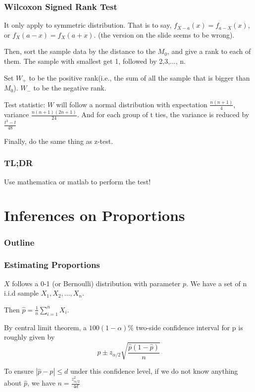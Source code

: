 \documentclass{beamer}
\begin{document}
\begin{frame}
    \frametitle{Wilcoxon Signed Rank Test}

    It only apply to symmetric distribution. That is to say, $f_{X-a}(x)=f_{a-X}(x)$, or $f_{X}(a-x)=f_{X}(a+x)$. (the version on the slide seems to be wrong).\par
    \vspace*{0.3cm}
    Then, sort the sample data by the distance to the $M_0$, and give a rank to each of them. The sample with smallest get 1, followed by 2,3,..., n.\par
    Set $W_{+}$ to be the positive rank(i.e., the sum of all the sample that is bigger than $M_0$). $W_{-}$ to be the negative rank.\par

    Test statistic: $W$ will follow a normal distribution with expectation $\frac{n(n+1)}{4}$, variance $\frac{n(n+1)(2n+1)}{24}$. And for each group of t ties, the variance is reduced by $\frac{t^3-t}{48}$\par
    Finally, do the same thing as z-test.

\end{frame}

\begin{frame}
    \frametitle{TL;DR}

    Use mathematica or matlab to perform the test!\par
    

\end{frame}

\section{Inferences on Proportions}
\begin{frame}
    \frametitle{Outline}
    \tableofcontents[currentsection]
\end{frame}

\begin{frame}
    \frametitle{Estimating Proportions}
    $X$ follows a 0-1 (or Bernoulli) distribution with parameter $p$. We have a set of n i.i.d sample $X_1, X_2, \dots , X_n$.\par
    Then $\hat{p}=\frac{1}{n}\sum\limits_{i=1}^{n}X_i$. \par
    By central limit theorem, a $100(1-\alpha)\%$ two-side confidence interval for p is roughly given by 
    \[\hat{p}\pm z_{\alpha/2}\sqrt{\frac{\hat{p}(1-\hat{p})}{n}}\]
    
    To ensure $|\hat{p}-p|\leq d$ under this confidence level, if we do not know anything about $\hat{p}$, we have $n=\frac{z_{\alpha/2}^2}{4d}$

\end{frame}
\end{document}
